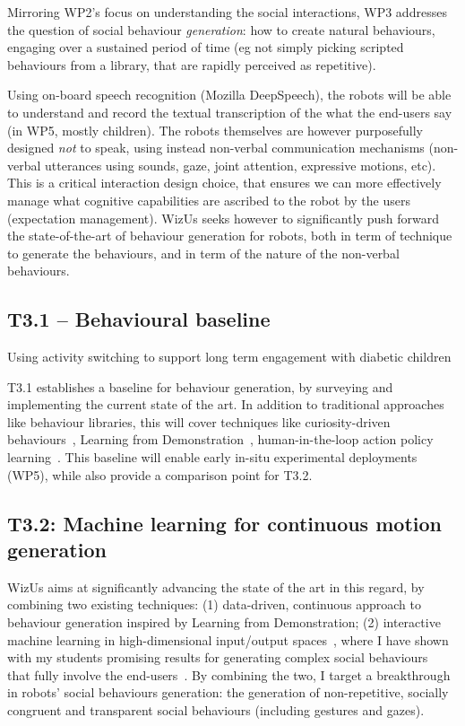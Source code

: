 \documentclass[11pt,a4paper]{report}
\newcommand{\project}{WizUs\xspace}
\begin{document}
Mirroring WP2's focus on understanding the social interactions, WP3 addresses the
question of social behaviour \emph{generation}: how to create natural
behaviours, engaging over a sustained period of time (eg not simply picking
scripted behaviours from a library, that are rapidly perceived as repetitive).

Using on-board speech recognition (Mozilla DeepSpeech), the robots will be able to understand and
record the textual transcription of the what the end-users say (in WP5, mostly
children). The robots themselves are however purposefully designed \emph{not} to
speak, using instead non-verbal communication mechanisms (non-verbal utterances
using sounds, gaze, joint attention, expressive motions, etc). This is a
critical interaction design choice, that ensures we can more effectively manage
what cognitive capabilities are ascribed to the robot by the users (expectation
management).  \project seeks however to significantly push forward the
state-of-the-art of behaviour generation for robots, both in term of technique to
generate the behaviours, and in term of the nature of the non-verbal behaviours.


\subsection{T3.1 -- Behavioural baseline}


Using activity switching to support long term engagement with diabetic children~\cite{coninx2016towards}

T3.1 establishes a baseline for behaviour
generation, by surveying and implementing the current state of the art. In
addition to traditional approaches like behaviour libraries, this will cover
techniques like curiosity-driven behaviours~\cite{oudeyer2005playground},
Learning from Demonstration~\cite{billard2008robot, argall2009survey},
human-in-the-loop action policy learning~\cite{senft2016sparc,
senft2019teaching}. This baseline will enable early in-situ experimental
deployments (WP5), while also provide a comparison point for T3.2.

\subsection{T3.2: Machine learning for continuous motion generation}

\project aims
at significantly advancing the state of the art in this regard, by combining two
existing techniques: (1) data-driven, continuous approach to behaviour
generation inspired by Learning from Demonstration; (2) interactive machine
learning in high-dimensional input/output spaces~\cite{senft2020woz}, where I
have shown with my students promising results for generating complex social
behaviours~\cite{senft2019teaching, winkle2020couch} that fully involve the
end-users~\cite{winkle2018social}.  By combining the two, I target
a breakthrough in robots' social behaviours generation: the generation of
non-repetitive, socially congruent and transparent social behaviours (including
gestures and gazes).
\end{document}
